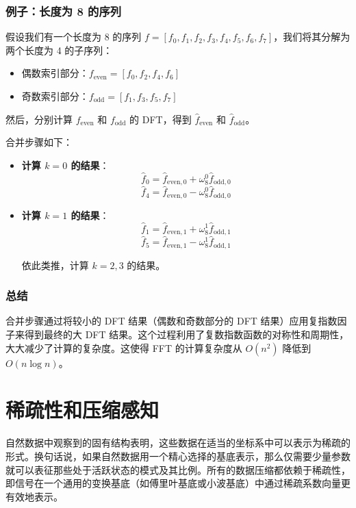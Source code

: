 \documentclass{ctexart}
\begin{document}
\subsubsection{例子：长度为 8 的序列}

假设我们有一个长度为 8 的序列 \( f = [f_0, f_1, f_2, f_3, f_4, f_5, f_6, f_7] \)，我们将其分解为两个长度为 4 的子序列：

\begin{itemize}
    \item 偶数索引部分：\( f_{\text{even}} = [f_0, f_2, f_4, f_6] \)
    \item 奇数索引部分：\( f_{\text{odd}} = [f_1, f_3, f_5, f_7] \)
\end{itemize}

然后，分别计算 \( f_{\text{even}} \) 和 \( f_{\text{odd}} \) 的 DFT，得到 \( \hat{f}_{\text{even}} \) 和 \( \hat{f}_{\text{odd}} \)。

合并步骤如下：

\begin{itemize}
    \item \textbf{计算 \( k = 0 \) 的结果}：
    \[
    \hat{f}_0 = \hat{f}_{\text{even}, 0} + \omega_8^0 \hat{f}_{\text{odd}, 0}
    \]
    \[
    \hat{f}_4 = \hat{f}_{\text{even}, 0} - \omega_8^0 \hat{f}_{\text{odd}, 0}
    \]

    \item \textbf{计算 \( k = 1 \) 的结果}：
    \[
    \hat{f}_1 = \hat{f}_{\text{even}, 1} + \omega_8^1 \hat{f}_{\text{odd}, 1}
    \]
    \[
    \hat{f}_5 = \hat{f}_{\text{even}, 1} - \omega_8^1 \hat{f}_{\text{odd}, 1}
    \]

    依此类推，计算 \( k = 2, 3 \) 的结果。
\end{itemize}

\subsubsection{总结}

合并步骤通过将较小的 DFT 结果（偶数和奇数部分的 DFT 结果）应用复指数因子来得到最终的大 DFT 结果。这个过程利用了复数指数函数的对称性和周期性，大大减少了计算的复杂度。这使得 FFT 的计算复杂度从 \( O(n^2) \) 降低到 \( O(n \log n) \)。

\section{稀疏性和压缩感知}

自然数据中观察到的固有结构表明，这些数据在适当的坐标系中可以表示为稀疏的形式。换句话说，如果自然数据用一个精心选择的基底表示，那么仅需要少量参数就可以表征那些处于活跃状态的模式及其比例。所有的数据压缩都依赖于稀疏性，即信号在一个通用的变换基底（如傅里叶基底或小波基底）中通过稀疏系数向量更有效地表示。
\end{document}
